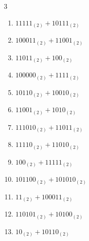 \begin{multicols}{3}
\begin{enumerate}

  \item $11111_{(2)} + 10111_{(2)}$


  \item $100011_{(2)} + 11001_{(2)}$


  \item $11011_{(2)} + 100_{(2)}$


  \item $100000_{(2)} + 1111_{(2)}$


  \item $10110_{(2)} + 10010_{(2)}$


  \item $11001_{(2)} + 1010_{(2)}$


  \item $111010_{(2)} + 11011_{(2)}$


  \item $11110_{(2)} + 11010_{(2)}$


  \item $100_{(2)} + 11111_{(2)}$


\columnbreak %

  \item $101100_{(2)} + 101010_{(2)}$


  \item $11_{(2)} + 100011_{(2)}$


  \item $110101_{(2)} + 10100_{(2)}$


  \item $10_{(2)} + 10110_{(2)}$



\end{enumerate}
\end{multicols}
